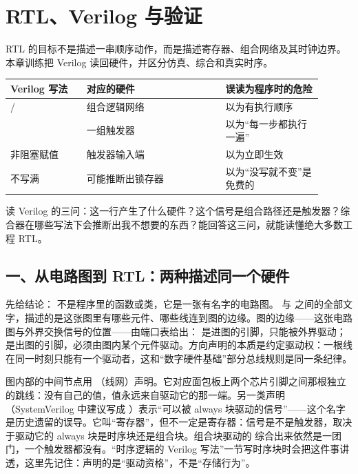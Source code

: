\chapter{RTL、Verilog 与验证}

\begin{keyidea}
RTL 的目标不是描述一串顺序动作，而是描述寄存器、组合网络及其时钟边界。本章训练把 Verilog 读回硬件，并区分仿真、综合和真实时序。
\end{keyidea}

\begin{longtable}{L{0.22\linewidth}L{0.4\linewidth}L{0.28\linewidth}}
\toprule
Verilog 写法 & 对应的硬件 & 误读为程序时的危险 \\
\midrule
{} /  & 组合逻辑网络 & 以为有执行顺序 \\\tablerowrule
{} & 一组触发器 & 以为“每一步都执行一遍” \\\tablerowrule
非阻塞赋值 \code{<=} & 触发器输入端 & 以为立即生效 \\\tablerowrule
{} 不写满 & 可能推断出锁存器 & 以为“没写就不变”是免费的 \\
\bottomrule
\end{longtable}

\begin{keyidea}
读 Verilog 的三问：这一行产生了什么硬件？这个信号是组合路径还是触发器？综合器在哪些写法下会推断出我不想要的东西？能回答这三问，就能读懂绝大多数工程 RTL。
\end{keyidea}

\section{一、从电路图到 RTL：两种描述同一个硬件}

先给结论： 不是程序里的函数或类，它是一张有名字的电路图。 与  之间的全部文字，描述的是这张图里有哪些元件、哪些线连到图的边缘。图的边缘——这张电路图与外界交换信号的位置——由端口表给出： 是进图的引脚，只能被外界驱动； 是出图的引脚，必须由图内某个元件驱动。方向声明的本质是约定驱动权：一根线在同一时刻只能有一个驱动者，这和“数字硬件基础”部分总线规则是同一条纪律。

图内部的中间节点用 （线网）声明。它对应面包板上两个芯片引脚之间那根独立的跳线：没有自己的值，值永远来自驱动它的那一端。另一类声明 （SystemVerilog 中建议写成 ）表示“可以被 always 块驱动的信号”——这个名字是历史遗留的误导。它叫“寄存器”，但不一定是寄存器：信号是不是触发器，取决于驱动它的 always 块是时序块还是组合块。组合块驱动的  综合出来依然是一团门，一个触发器都没有。“时序逻辑的 Verilog 写法”一节写时序块时会把这件事讲透，这里先记住：声明的是“驱动资格”，不是“存储行为”。

